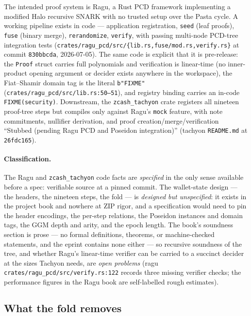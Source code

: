 \documentclass[11pt,a4paper]{article}
\theoremstyle{definition}
\begin{document}
The intended proof system is Ragu, a Rust PCD framework implementing a
modified Halo recursive SNARK with no trusted setup over the Pasta cycle. A
working pipeline exists in code --- application registration, \texttt{seed}
(leaf proofs), \texttt{fuse} (binary merge), \texttt{rerandomize},
\texttt{verify}, with passing multi-node PCD-tree integration tests
(\texttt{crates/ragu\_pcd/src/\{lib.rs,fuse/mod.rs,verify.rs\}} at commit
\texttt{830bbcda}, 2026-07-05). The same code is explicit that it is
pre-release: the \texttt{Proof} struct carries full polynomials and
verification is linear-time (no inner-product opening argument or decider
exists anywhere in the workspace), the Fiat--Shamir domain tag is the
literal \texttt{b"FIXME"} (\texttt{crates/ragu\_pcd/src/lib.rs:50--51}), and
registry binding carries an in-code \texttt{FIXME(security)}. Downstream,
the \texttt{zcash\_tachyon} crate registers all nineteen proof-tree steps but
compiles only against Ragu's \texttt{mock} feature, with note commitments,
nullifier derivation, and proof creation/merge/verification ``Stubbed
(pending Ragu PCD and Poseidon integration)'' (tachyon \texttt{README.md} at
\texttt{26fdc165}).

\paragraph{Classification.} The Ragu and \texttt{zcash\_tachyon} code facts
are \emph{specified} in the only sense available before a spec: verifiable
source at a pinned commit. The wallet-state design --- the headers, the
nineteen steps, the fold --- is \emph{designed but unspecified}: it exists in
the project book and nowhere at ZIP rigor, and a specification would need to
pin the header encodings, the per-step relations, the Poseidon instances and
domain tags, the GGM depth and arity, and the epoch length. The book's
soundness section is prose --- no formal definitions, theorems, or
machine-checked statements, and the eprint contains none either --- so
recursive soundness of the tree, and whether Ragu's linear-time verifier can
be carried to a succinct decider at the sizes Tachyon needs, are \emph{open
problems} (ragu \texttt{crates/ragu\_pcd/src/verify.rs:122} records three
missing verifier checks; the performance figures in the Ragu book are
self-labelled rough estimates).

\subsection{What the fold removes}\label{sec:tachyon-removes}
\end{document}
